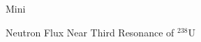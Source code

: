 \documentclass[sans,mathserif,aspectratio=169]{beamer}
\begin{document}
\begin{frame}{Mini}
\begin{minipage}{0.48\linewidth}
\end{minipage}\hfill
\begin{minipage}{0.48\linewidth}
\end{minipage}
\end{frame}

\begin{frame}{Neutron Flux Near Third Resonance of $^{238}$U}
\centering
{}
\end{frame}
\end{document}
